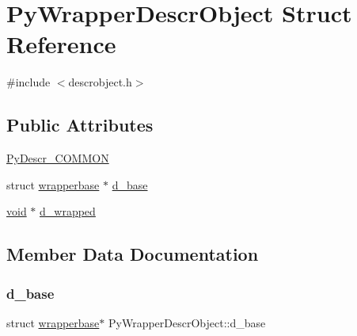 \hypertarget{struct_py_wrapper_descr_object}{}\section{Py\+Wrapper\+Descr\+Object Struct Reference}
\label{struct_py_wrapper_descr_object}


{\ttfamily \#include $<$descrobject.\+h$>$}

\subsection*{Public Attributes}
\begin{DoxyCompactItemize}
\item 
\mbox{\hyperlink{struct_py_wrapper_descr_object_af009d6c8b2a67ec479a9dea3db47e59b}{Py\+Descr\+\_\+\+C\+O\+M\+M\+ON}}
\item 
struct \mbox{\hyperlink{structwrapperbase}{wrapperbase}} $\ast$ \mbox{\hyperlink{struct_py_wrapper_descr_object_a519791b757bde55de79e71995921a55f}{d\+\_\+base}}
\item 
\mbox{\hyperlink{_s_d_l__opengles2__gl2ext_8h_ae5d8fa23ad07c48bb609509eae494c95}{void}} $\ast$ \mbox{\hyperlink{struct_py_wrapper_descr_object_a7cd533134c75902cc81d4a92631b5f5b}{d\+\_\+wrapped}}
\end{DoxyCompactItemize}


\subsection{Member Data Documentation}
\mbox{\label{struct_py_wrapper_descr_object_a519791b757bde55de79e71995921a55f}} 
\subsubsection{\texorpdfstring{d\_base}{d\_base}}
{\footnotesize\ttfamily struct \mbox{\hyperlink{structwrapperbase}{wrapperbase}}$\ast$ Py\+Wrapper\+Descr\+Object\+::d\+\_\+base}

\mbox{\label{struct_py_wrapper_descr_object_a7cd533134c75902cc81d4a92631b5f5b}} 
